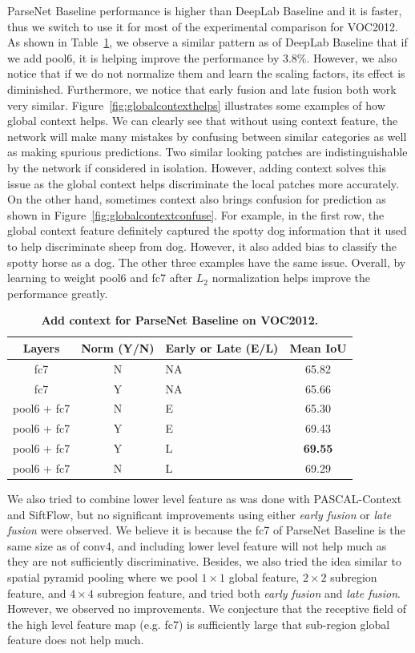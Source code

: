 \documentclass{article} %
\begin{document}
ParseNet Baseline performance is higher than DeepLab Baseline and it is faster, thus we switch to use it for most of the experimental comparison for VOC2012. As shown in Table~\ref{tab:voc2012fov}, we observe a similar pattern as of DeepLab Baseline that if we add pool6, it is helping improve the performance by 3.8\%. However, we also notice that if we do not normalize them and learn the scaling factors, its effect is diminished. Furthermore, we notice that early fusion and late fusion both work very similar. Figure~\ref{fig:globalcontexthelps} illustrates some examples of how global context helps. We can clearly see that without using context feature, the network will make many mistakes by confusing between similar categories as well as making spurious predictions. Two similar looking patches are indistinguishable by the network if considered in isolation. However, adding context solves this issue as the global context helps discriminate the local patches more accurately. On the other hand, sometimes context also brings confusion for prediction as shown in Figure~\ref{fig:globalcontextconfuse}. For example, in the first row, the global context feature definitely captured the spotty dog information that it used to help discriminate sheep from dog. However, it also added bias to classify the spotty horse as a dog. The other three examples have the same issue. Overall, by learning to weight pool6 and fc7 after $L_2$ normalization helps improve the performance greatly.
\begin{table}[!htb]
	\centering
	\begin{tabular}{c|c|m{4em}|c}
		Layers & Norm (Y/N) & Early or Late (E/L) & Mean IoU\\
		\hline\hline
		fc7 & N & NA & 65.82\\
		fc7 & Y & NA & 65.66\\
		pool6 + fc7 & N & E & 65.30\\
		pool6 + fc7 & Y & E & 69.43\\
		pool6 + fc7 & Y & L & \textbf{69.55}\\
		pool6 + fc7 & N & L & 69.29\\
		\hline
	\end{tabular}
	\caption{\textbf{Add context for ParseNet Baseline on VOC2012.}}\label{tab:voc2012fov}
\end{table}
\vspace{-0.5em}

We also tried to combine lower level feature as was done with PASCAL-Context and SiftFlow, but no significant improvements using either \emph{early fusion} or \emph{late fusion} were observed. We believe it is because the fc7 of ParseNet Baseline is the same size as of conv4, and including lower level feature will not help much as they are not sufficiently discriminative. Besides, we also tried the idea similar to spatial pyramid pooling where we pool $1\times 1$ global feature, $2\times 2$ subregion feature, and $4\times 4$ subregion feature, and tried both \emph{early fusion} and \emph{late fusion}. However, we observed no improvements. We conjecture that the receptive field of the high level feature map (e.g. fc7) is sufficiently large that sub-region global feature does not help much.
\end{document}
